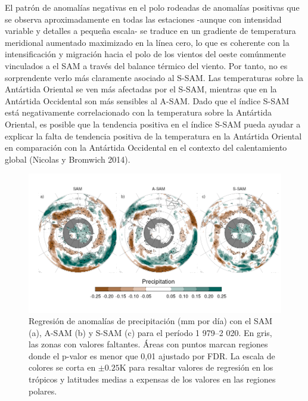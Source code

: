 \documentclass[12pt,oneside,a4paper]{reedthesis}
\begin{document}
El patrón de anomalías negativas en el polo rodeadas de anomalías positivas que se observa aproximadamente en todas las estaciones -aunque con intensidad variable y detalles a pequeña escala- se traduce en un gradiente de temperatura meridional aumentado maximizado en la línea cero, lo que es coherente con la intensificación y migración hacia el polo de los vientos del oeste comúnmente vinculados a el SAM a través del balance térmico del viento.
Por tanto, no es sorprendente verlo más claramente asociado al S-SAM.
Las temperaturas sobre la Antártida Oriental se ven más afectadas por el S-SAM, mientras que en la Antártida Occidental son más sensibles al A-SAM.
Dado que el índice S-SAM está negativamente correlacionado con la temperatura sobre la Antártida Oriental, es posible que la tendencia positiva en el índice S-SAM pueda ayudar a explicar la falta de tendencia positiva de la temperatura en la Antártida Oriental en comparación con la Antártida Occidental en el contexto del calentamiento global (Nicolas y Bromwich 2014).



\begin{figure}

{\centering \includegraphics{figures/30-sam/global-pp-1} 

}

\caption{Regresión de anomalías de precipitación (mm por día) con el SAM (a), A-SAM (b) y S-SAM (c) para el período 1 979--2 020. En gris, las zonas con valores faltantes. Áreas con puntos marcan regiones donde el p-valor es menor que 0,01 ajustado por FDR. La escala de colores se corta en \(\pm0.25 \mathrm{K}\) para resaltar valores de regresión en los trópicos y latitudes medias a expensas de los valores en las regiones polares.}\label{fig:global-pp}
\end{figure}
\end{document}
